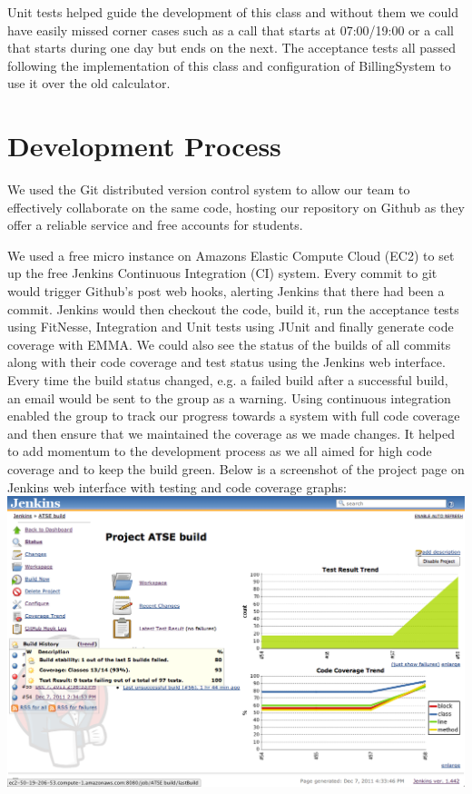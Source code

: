 \documentclass[a4paper,11pt]{article}
\begin{document}
Unit tests helped guide the development of this class and without them we could have easily missed corner cases such as a call that starts at 07:00/19:00 or a call that starts during one day but ends on the next. The acceptance tests all passed following the implementation of this class and configuration of BillingSystem to use it over the old calculator.

\section{Development Process}
We used the Git distributed version control system to allow our team to effectively collaborate on the same code, hosting our repository on Github as they offer a reliable service and free accounts for students. 

We used a free micro instance on Amazons Elastic Compute Cloud (EC2) to set up the free Jenkins Continuous Integration (CI) system. Every commit to git would trigger Github's post web hooks, alerting Jenkins that there had been a commit. Jenkins would then checkout the code, build it, run the acceptance tests using FitNesse, Integration and Unit tests using JUnit and finally generate code coverage with EMMA. We could also see the status of the builds of all commits along with their code coverage and test status using the Jenkins web interface. Every time the build status changed, e.g. a failed build after a successful build, an email would be sent to the group as a warning. Using continuous integration enabled the group to track our progress towards a system with full code coverage and then ensure that we maintained the coverage as we made changes. It helped to add momentum to the development process as we all aimed for high code coverage and to keep the build green. Below is a screenshot of the project page on Jenkins web interface with testing and code coverage graphs:
\\

\includegraphics[scale=0.4]{images/jenkins_project.png}
\\
\end{document}
